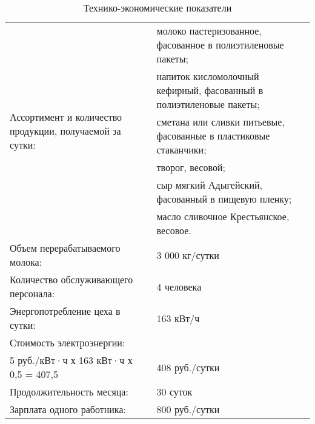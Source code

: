 \begin{table}[]
	\small
	\centering
	\caption{Технико-экономические показатели}
	\label{my-label}
	\setlength{\extrarowheight}{0.7mm}
	\begin{tabularx}{\textwidth}{|p{8.05cm}|p{8.05cm}|}
		\hline
		\multirow{6}{8cm}{Ассортимент и количество продукции, получаемой за сутки:} & молоко пастеризованное, фасованное в полиэтиленовые пакеты;     \\ %
																				& напиток кисломолочный кефирный, фасованный в полиэтиленовые пакеты; \\ %
																				& сметана или сливки питьевые, фасованные в пластиковые стаканчики;   \\ %
																				& творог, весовой;                                                    \\ %
																				& сыр мягкий Адыгейский, фасованный в пищевую пленку;                 \\ %
																				& масло сливочное Крестьянское, весовое.                              \\ \hline
		Объем перерабатываемого молока:                                         & 3 000 кг/сутки                                                      \\ \hline
		Количество обслуживающего персонала:                                    & 4 человека                                                          \\ \hline
		Энергопотребление цеха в сутки:                                         & 163 кВт/ч                                                           \\ \hline
		\multicolumn{2}{|l|}{Стоимость электроэнергии:}                                                                                               \\ \hline
		5 руб./кВт·ч х 163 кВт·ч х 0,5 = 407,5                                  & 408 руб./сутки                                                      \\ \hline
		Продолжительность месяца:                                               & 30 суток                                                            \\ \hline
		Зарплата одного работника:                                              & 800 руб./сутки                                                      \\ \hline

\end{tabularx}
\end{table}
